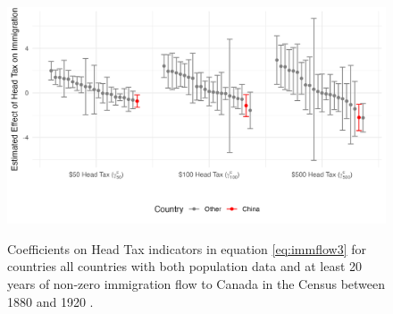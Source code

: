 \begin{figure}[h!]
    \centering 
    \caption{Coefficients on Head Tax indicators in equation \ref{eq:immflow3} for countries all countries with both population data and at least 20 years of non-zero immigration flow to Canada in the Census between 1880 and 1920 \citep{census1901, census1911, census1921, maddison2010}.}
    \includegraphics[width=\textwidth]{../../figs/immflow_countries.png}
    \label{fig:gammac}
\end{figure}

